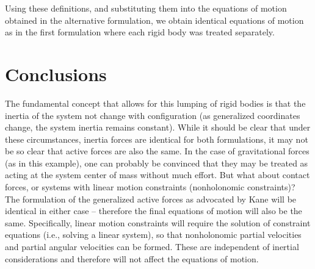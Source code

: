 \documentclass[letterpaper,11pt]{article}
\begin{document}
Using these definitions, and substituting them into the equations of motion
obtained in the alternative formulation, we obtain identical equations of
motion as in the first formulation where each rigid body was treated
separately.

\section*{Conclusions}

The fundamental concept that allows for this lumping of rigid bodies is that
the inertia of the system not change with configuration (as generalized
coordinates change, the system inertia remains constant).  While it should be
clear that under these circumstances, inertia forces are identical for both
formulations, it may not be so clear that active forces are also the same.  In
the case of gravitational forces (as in this example), one can probably be
convinced that they may be treated as acting at the system center of mass
without much effort.  But what about contact forces, or systems with linear
motion constraints (nonholonomic constraints)?  The formulation of the
generalized active forces as advocated by Kane will be identical in either case
-- therefore the final equations of motion will also be the same.
Specifically, linear motion constraints will require the solution of constraint
equations (i.e., solving a linear system), so that nonholonomic partial
velocities and partial angular velocities can be formed.  These are independent
of inertial considerations and therefore will not affect the equations of
motion.
\end{document}
